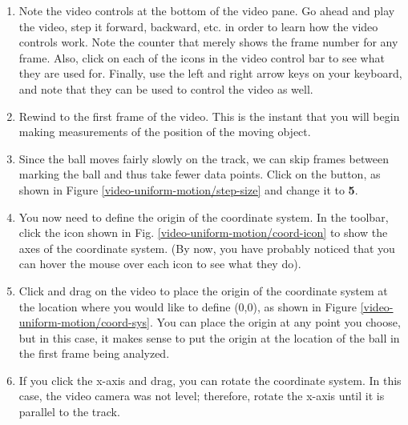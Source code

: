 \begin{enumerate}
	\item Note the video controls at the bottom of the video pane. Go ahead and play the video, step it forward, backward, etc. in order to learn how the video controls work. Note the counter that merely shows the frame number for any frame. Also, click on each of the icons in the video control bar to see what they are used for. Finally, use the left and right arrow keys on your keyboard, and note that they can be used to control the video as well.

	\item Rewind to the first frame of the video. This is the instant that you will begin making measurements of the position of the moving object.
	
	\item Since the ball moves fairly slowly on the track, we can skip frames between marking the ball and thus take fewer data points. Click on the  button, as shown in Figure \ref{video-uniform-motion/step-size} and change it to {\bf 5}.
	
	
	\item You now need to define the origin of the coordinate system. In the toolbar, click the  icon shown in Fig. \ref{video-uniform-motion/coord-icon} to show the axes of the coordinate system. (By now, you have probably noticed that you can hover the mouse over each icon to see what they do).
	

	\item Click and drag on the video to place the origin of the coordinate system at the location where you would like to define (0,0), as shown in Figure \ref{video-uniform-motion/coord-sys}. You can place the origin at any point you choose, but in this case, it makes sense to put the origin at the location of the ball in the first frame being analyzed. 
		
	
	\item If you click the x-axis and drag, you can rotate the coordinate system. In this case, the video camera was not level; therefore, rotate the x-axis until it is parallel to the track.
	

\end{enumerate}

